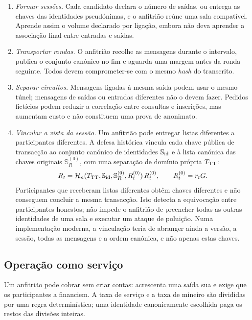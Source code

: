 \begin{enumerate}
 \item \emph{Formar sessões.} Cada candidato declara o número de saídas, ou
 entrega as chaves das identidades pseudónimas, e o anfitrião reúne uma sala
 compatível. Aprende assim o volume declarado por ligação, embora não deva
 aprender a associação final entre entradas e saídas.

 \item \emph{Transportar rondas.} O anfitrião recolhe as mensagens durante o
 intervalo, publica o conjunto canónico no fim e aguarda uma margem antes da
 ronda seguinte. Todos devem comprometer-se com o mesmo \emph{hash} do
 transcrito.

 \item \emph{Separar circuitos.} Mensagens ligadas à mesma saída podem usar o
 mesmo túnel; mensagens de saídas ou entradas diferentes não o devem fazer.
 Pedidos fictícios podem reduzir a correlação entre consultas e inscrições,
 mas aumentam custo e não constituem uma prova de anonimato.

 \item \emph{Vincular a vista da sessão.} Um anfitrião pode entregar listas
 diferentes a participantes diferentes. A defesa histórica vincula cada chave
 pública de transacção ao conjunto canónico de identidades
 \(\mathbb S_{\rm id}\) e à lista canónica das chaves originais
 \(\mathbb S_R^{(0)}\), com uma separação de domínio própria \(T_{\rm TT}\):
 \[
  R_t=
  \mathcal H_n(T_{\rm TT},\mathbb S_{\rm id},\mathbb S_R^{(0)},R_t^{(0)})
  \,R_t^{(0)},
  \qquad R_t^{(0)}=r_tG.
 \]
 Participantes que receberam listas diferentes obtêm chaves diferentes e não
 conseguem concluir a mesma transacção. Isto detecta a equivocação entre
 participantes honestos; não impede o anfitrião de preencher todas as outras
 identidades de uma sala e executar um ataque de poluição. Numa implementação
 moderna, a vinculação teria de abranger ainda a versão, a sessão, todas as
 mensagens e a ordem canónica, e não apenas estas chaves.
\end{enumerate}

\subsection{Operação como serviço}
\label{subsec:txtangle-host-service}

Um anfitrião pode cobrar sem criar contas: acrescenta uma saída sua e exige
que os participantes a financiem. A taxa de serviço e a taxa de mineiro são
divididas por uma regra determinística; uma identidade canonicamente escolhida
paga os restos das divisões inteiras.

